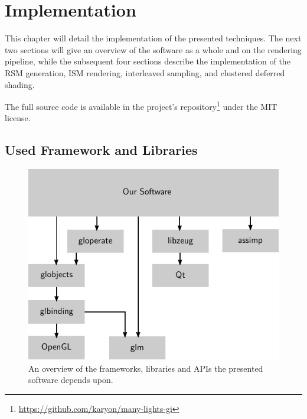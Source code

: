 

\chapter{Implementation}
\label{chap:implementation}

This chapter will detail the implementation of the presented techniques. The next two sections will give an overview of the software as a whole and on the rendering pipeline, while the subsequent four sections describe the implementation of the RSM generation, ISM rendering, interleaved sampling, and clustered deferred shading.

The full source code is available in the project's repository\footnote{\url{https://github.com/karyon/many-lights-gi}} under the MIT license.


\section{Used Framework and Libraries}

\begin{figure}[htbp]
  \centering
  \includegraphics{graphics/dependencies}
  \caption{An overview of the frameworks, libraries and APIs the presented software depends upon.}
\end{figure}

